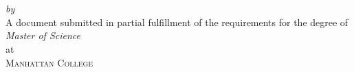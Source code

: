 \begin{titlepage}
  \vspace*{5cm}
  \makeatletter
  \begin{center}
    \begin{Huge}
      \@title
    \end{Huge}\\[0.1cm]
    \begin{Large}
      \@subtitle
    \end{Large}\\
    \emph{by}\\
    \@author
    \vfill
    A document submitted in partial fulfillment
    of the requirements for the degree of\\
    \emph{Master of Science}\\
    at\\
    \textsc{Manhattan College}
  \end{center}
  \makeatother
\end{titlepage}

\newpage
\null
\thispagestyle{empty}
\newpage
